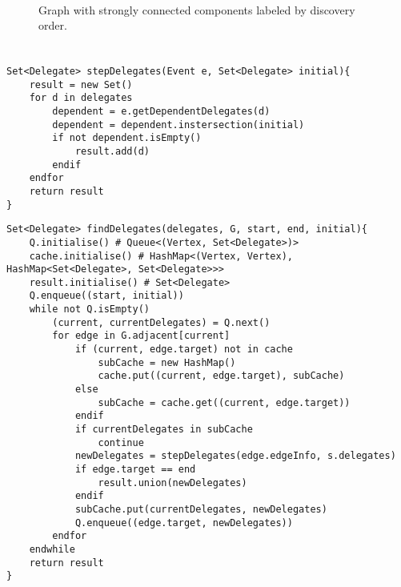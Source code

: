 \documentclass{article}
\begin{document}
\subsection{}

\subsection{}

\begin{figure}[H]
\centering
{}
\caption{Graph with strongly connected components labeled by discovery order.}
\end{figure}

\part{}
\section{}
\subsection{}
\begin{verbatim}
Set<Delegate> stepDelegates(Event e, Set<Delegate> initial){
    result = new Set()
    for d in delegates
        dependent = e.getDependentDelegates(d)
        dependent = dependent.instersection(initial)
        if not dependent.isEmpty()
            result.add(d)
        endif
    endfor
    return result
}
\end{verbatim}

\begin{verbatim}
Set<Delegate> findDelegates(delegates, G, start, end, initial){
    Q.initialise() # Queue<(Vertex, Set<Delegate>)>
    cache.initialise() # HashMap<(Vertex, Vertex), HashMap<Set<Delegate>, Set<Delegate>>>
    result.initialise() # Set<Delegate>
    Q.enqueue((start, initial))
    while not Q.isEmpty()
        (current, currentDelegates) = Q.next()
        for edge in G.adjacent[current]
            if (current, edge.target) not in cache
                subCache = new HashMap()
                cache.put((current, edge.target), subCache)
            else
                subCache = cache.get((current, edge.target))
            endif
            if currentDelegates in subCache
                continue
            newDelegates = stepDelegates(edge.edgeInfo, s.delegates)
            if edge.target == end
                result.union(newDelegates)
            endif
            subCache.put(currentDelegates, newDelegates)
            Q.enqueue((edge.target, newDelegates))
        endfor
    endwhile
    return result
}
\end{verbatim}
\end{document}
